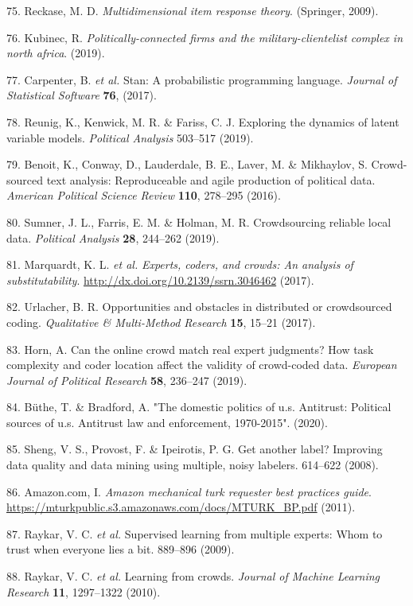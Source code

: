 \documentclass[]{article}
\begin{document}
\leavevmode\hypertarget{ref-reckase2009}{}%
75. Reckase, M. D. \emph{Multidimensional item response theory}. (Springer, 2009).

\leavevmode\hypertarget{ref-kubinec2019}{}%
76. Kubinec, R. \emph{Politically-connected firms and the military-clientelist complex in north africa}. (2019).

\leavevmode\hypertarget{ref-carpenter2017}{}%
77. Carpenter, B. \emph{et al.} Stan: A probabilistic programming language. \emph{Journal of Statistical Software} \textbf{76}, (2017).

\leavevmode\hypertarget{ref-reunig2019}{}%
78. Reunig, K., Kenwick, M. R. \& Fariss, C. J. Exploring the dynamics of latent variable models. \emph{Political Analysis} 503--517 (2019).

\leavevmode\hypertarget{ref-benoitetal2016}{}%
79. Benoit, K., Conway, D., Lauderdale, B. E., Laver, M. \& Mikhaylov, S. Crowd-sourced text analysis: Reproduceable and agile production of political data. \emph{American Political Science Review} \textbf{110}, 278--295 (2016).

\leavevmode\hypertarget{ref-sumneretal2019}{}%
80. Sumner, J. L., Farris, E. M. \& Holman, M. R. Crowdsourcing reliable local data. \emph{Political Analysis} \textbf{28}, 244--262 (2019).

\leavevmode\hypertarget{ref-marquardtetal2017}{}%
81. Marquardt, K. L. \emph{et al.} \emph{Experts, coders, and crowds: An analysis of substitutability}. \url{http://dx.doi.org/10.2139/ssrn.3046462} (2017).

\leavevmode\hypertarget{ref-Urlacher2017}{}%
82. Urlacher, B. R. Opportunities and obstacles in distributed or crowdsourced coding. \emph{Qualitative \& Multi-Method Research} \textbf{15}, 15--21 (2017).

\leavevmode\hypertarget{ref-Horn2019}{}%
83. Horn, A. Can the online crowd match real expert judgments? How task complexity and coder location affect the validity of crowd-coded data. \emph{European Journal of Political Research} \textbf{58}, 236--247 (2019).

\leavevmode\hypertarget{ref-buthe2020}{}%
84. Büthe, T. \& Bradford, A. "The domestic politics of u.s. Antitrust: Political sources of u.s. Antitrust law and enforcement, 1970-2015". (2020).

\leavevmode\hypertarget{ref-Sheng2008}{}%
85. Sheng, V. S., Provost, F. \& Ipeirotis, P. G. Get another label? Improving data quality and data mining using multiple, noisy labelers. 614--622 (2008).

\leavevmode\hypertarget{ref-MTurk2011}{}%
86. Amazon.com, I. \emph{Amazon mechanical turk requester best practices guide}. \url{https://mturkpublic.s3.amazonaws.com/docs/MTURK_BP.pdf} (2011).

\leavevmode\hypertarget{ref-Raykar2009}{}%
87. Raykar, V. C. \emph{et al.} Supervised learning from multiple experts: Whom to trust when everyone lies a bit. 889--896 (2009).

\leavevmode\hypertarget{ref-Raykar2010}{}%
88. Raykar, V. C. \emph{et al.} Learning from crowds. \emph{Journal of Machine Learning Research} \textbf{11}, 1297--1322 (2010).
\end{document}
